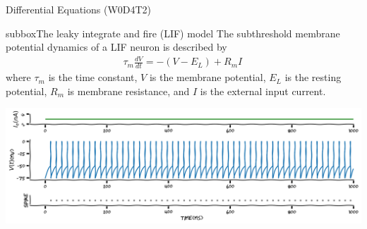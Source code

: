 \begin{textbox}{Differential Equations (W0D4T2) }
\begin{subbox}{subbox}{The leaky integrate and fire (LIF) model}
The subthreshold membrane potential dynamics of a LIF neuron is described by
\begin{align}
\tau_m\frac{dV}{dt} = -(V-E_L) + R_mI\,
\end{align}
where $\tau_m$ is the time constant, $V$ is the membrane potential,  $E_L$ is the resting potential, $R_m$ is membrane resistance, and $I$ is the external input current. 

\centering
\includegraphics[scale=0.18]{Figures/PreCourse/CFigure6.png}
\end{subbox}
\end{textbox}
